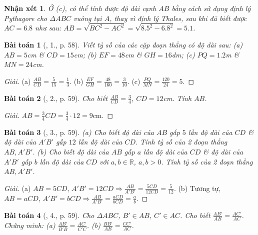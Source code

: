 \documentclass{article}
\newtheorem{baitoan}{Bài toán}
\newtheorem{nhanxet}{Nhận xét}
\begin{document}
\begin{nhanxet}
	Ở (c), có thể tính được độ dài cạnh $AB$ bằng cách sử dụng định lý Pythagore cho $\Delta ABC$ vuông tại $A$, thay vì định lý Thales, sau khi đã biết được $AC = 6.8$ như sau: $AB = \sqrt{BC^2 - AC^2} = \sqrt{8.5^2 - 6.8^2} = 5.1$.
\end{nhanxet}

\begin{baitoan}[\cite{SGK_Toan_8_tap_2}, 1., p. 58]
	Viết tỷ số của các cặp đoạn thẳng có độ dài sau: (a) $AB = 5$\emph{cm} \& $CD = 15$\emph{cm}; (b) $EF = 48$\emph{cm} \& $GH = 16$\emph{dm}; (c) $PQ = 1.2$\emph{m} \& $MN = 24$\emph{cm}.
\end{baitoan}

\begin{proof}[Giải]
	(a) $\frac{AB}{CD} = \frac{5}{15} = \frac{1}{3}$. (b) $\frac{EF}{GH} = \frac{48}{160} = \frac{3}{10}$. (c) $\frac{PQ}{MN} = \frac{120}{24} = 5$.
\end{proof}

\begin{baitoan}[\cite{SGK_Toan_8_tap_2}, 2., p. 59]
	Cho biết $\frac{AB}{CD} = \frac{3}{4}$, $CD = 12$\emph{cm}. Tính $AB$.
\end{baitoan}

\begin{proof}[Giải]
	$AB = \frac{3}{4}CD = \frac{3}{4}\cdot12 = 9$cm.
\end{proof}

\begin{baitoan}[\cite{SGK_Toan_8_tap_2}, 3., p. 59]
	(a) Cho biết độ dài của $AB$ gấp $5$ lần độ dài của $CD$ \& độ dài của $A'B'$ gấp $12$ lần độ dài của $CD$. Tính tỷ số của 2 đoạn thẳng $AB,A'B'$. (b) Cho biết độ dài của $AB$ gấp $a$ lần độ dài của $CD$ \& độ dài của $A'B'$ gấp $b$ lần độ dài của $CD$ với $a,b\in\mathbb{R}$, $a,b > 0$. Tính tỷ số của 2 đoạn thẳng $AB,A'B'$.
\end{baitoan}

\begin{proof}[Giải]
	(a) $AB = 5CD$, $A'B' = 12CD\Rightarrow\frac{AB}{A'B'} = \frac{5CD}{12CD} = \frac{5}{12}$. (b) Tương tự, $AB = aCD$, $A'B' = bCD\Rightarrow\frac{AB}{A'B'} = \frac{aCD}{bCD} = \frac{a}{b}$.
\end{proof}

\begin{baitoan}[\cite{SGK_Toan_8_tap_2}, 4., p. 59]
	Cho $\Delta ABC$, $B'\in AB$, $C'\in AC$. Cho biết $\frac{AB'}{AB} = \frac{AC'}{AC}$. Chứng minh: (a) $\frac{AB'}{B'B} = \frac{AC'}{C'C}$. (b) $\frac{BB'}{AB} = \frac{CC'}{AC}$.
\end{baitoan}
\end{document}
